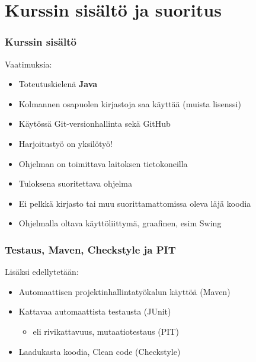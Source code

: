 \documentclass[finnish]{beamer}
\begin{document}
	\section{Kurssin sisältö ja suoritus}
	
	\begin{frame}
		\frametitle{Kurssin sisältö}

		Vaatimuksia:
		\begin{itemize}
			\item Toteutuskielenä \textbf{Java}
			\item Kolmannen osapuolen kirjastoja saa käyttää (muista lisenssi)
			\item Käytössä Git-versionhallinta sekä GitHub
			\item Harjoitustyö on yksilötyö!
			\item Ohjelman on toimittava laitoksen tietokoneilla
			\item Tuloksena suoritettava ohjelma
			\item Ei pelkkä kirjasto tai muu suorittamattomissa oleva läjä koodia
			\item Ohjelmalla oltava käyttöliittymä, graafinen, esim Swing
		\end{itemize}
	\end{frame}

	\begin{frame}
		\frametitle{Testaus, Maven, Checkstyle ja PIT}
		
		
		
		Lisäksi edellytetään:
		\begin{itemize}
			\item Automaattisen projektinhallintatyökalun käyttöä (Maven)
			\item Kattavaa automaattista testausta (JUnit)
			\begin{itemize}
				\item eli rivikattavuus, mutaatiotestaus (PIT)
			\end{itemize}
			\item Laadukasta koodia, Clean code (Checkstyle)
		\end{itemize}

		
	\end{frame}
	
\end{document}
